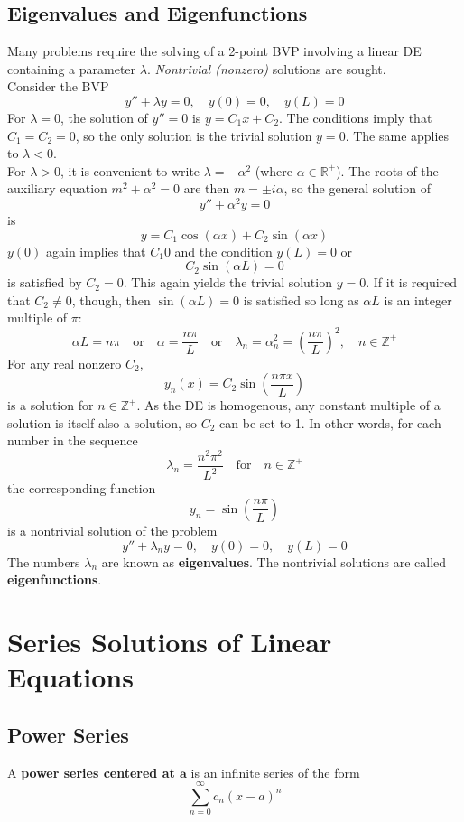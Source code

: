 \documentclass[12pt, A4]{article}
\newcommand{\R}{\mathbb{R}}
\newcommand{\Z}{\mathbb{Z}}
\begin{document}
		\subsection{Eigenvalues and Eigenfunctions}
			Many problems require the solving of a 2-point BVP involving a linear DE containing a parameter \(\lambda\). \textit{Nontrivial (nonzero)} solutions are sought. \\
			Consider the BVP
				\[
					y'' + \lambda y = 0, \quad
					y(0) = 0, \quad
					y(L) = 0
				\]
			For \(\lambda = 0\), the solution of \(y'' = 0\) is \(y = C_1x + C_2\). The conditions imply that \(C_1 = C_2 = 0\), so the only solution is the trivial solution \(y = 0\). The same applies to \(\lambda < 0\). \\
			For \(\lambda > 0\), it is convenient to write \(\lambda = -\alpha^2\) (where \(\alpha \in \R^+\)). The roots of the auxiliary equation \(m^2 + \alpha^2 = 0\) are then \(m = \pm i\alpha\), so the general solution of
				\[y'' + \alpha^2y = 0\]
				is
				\[y = C_1\cos(\alpha x) + C_2\sin(\alpha x)\]
				\(y(0)\) again implies that \(C_1  0\) and the condition \(y(L) = 0\) or
				\[C_2\sin(\alpha L) = 0\]
				is satisfied by \(C_2 = 0\). This again yields the trivial solution \(y = 0\). If it is required that \(C_2 \ne 0\), though, then \(\sin(\alpha L) = 0\) is satisfied so long as \(\alpha L\) is an integer multiple of \(\pi\):
				\[
					\alpha L = n\pi \quad \text{or} \quad
					\alpha = \frac{n\pi}{L} \quad \text{or} \quad
					\lambda_n = \alpha_n^2 = \left(\frac{n\pi}{L}\right)^2, \quad
					n \in \Z^+
				\]
				For any real nonzero \(C_2\),
				\[y_n(x) = C_2\sin\left(\frac{n\pi x}{L}\right)\]
				is a solution for \(n \in \Z^+\). As the DE is homogenous, any constant multiple of a solution is itself also a solution, so \(C_2\) can be set to 1. In other words, for each number in the sequence
				\[\lambda_n = \frac{n^2\pi^2}{L^2} \quad \text{for} \quad n \in \Z^+\]
				the corresponding function
				\[y_n = \sin\left(\frac{n\pi}{L}\right)\]
				is a nontrivial solution of the problem
				\[
					y'' + \lambda_ny = 0, \quad
					y(0) = 0, \quad
					y(L) = 0
				\]
				The numbers \(\lambda_n\) are known as \textbf{eigenvalues}. The nontrivial solutions are called \textbf{eigenfunctions}.
	\section{Series Solutions of Linear Equations}
		\subsection{Power Series}
			A \textbf{power series centered at \(\bm{a}\)} is an infinite series of the form
				\[\sum_{n = 0}^\infty c_n(x - a)^n\]
\end{document}
